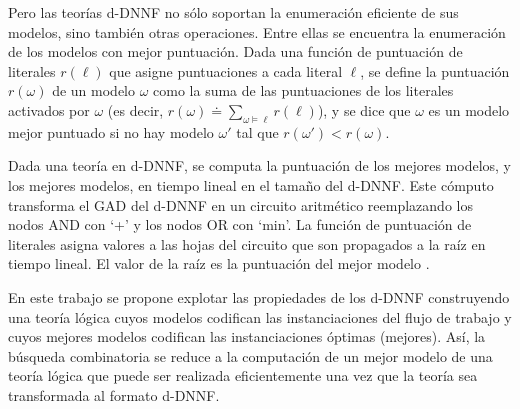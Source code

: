 Pero las teorías d-DNNF no sólo soportan la enumeración eficiente de sus
modelos, sino también otras operaciones. Entre ellas se encuentra la enumeración
de los modelos con mejor puntuación. Dada una función de puntuación de literales
$r(\ell)$ que asigne puntuaciones a cada literal $\ell$, se define la puntuación
$r(\omega)$ de un modelo $\omega$ como la suma de las puntuaciones de los literales
activados por $\omega$ (es decir,
$r(\omega)\doteq\sum_{\omega\vDash\ell}r(\ell)$), y se dice que $\omega$ es un modelo
mejor puntuado si no hay modelo $\omega'$ tal que $r(\omega')<r(\omega)$.

Dada una teoría en d-DNNF, se computa la puntuación de los mejores modelos, y
los mejores modelos, en tiempo lineal en el tamaño del d-DNNF. Este cómputo
transforma el GAD del d-DNNF en un circuito aritmético reemplazando los nodos
AND con `+' y los nodos OR con `min'. La función de puntuación de literales
asigna valores a las hojas del circuito que son propagados a la raíz en tiempo
lineal. El valor de la raíz es la puntuación del mejor modelo \cite{darwiche:weighted}.

En este trabajo se propone explotar las propiedades de los d-DNNF construyendo una
teoría lógica cuyos modelos codifican las instanciaciones del flujo de trabajo
y cuyos mejores modelos codifican las instanciaciones óptimas (mejores). Así, la
búsqueda combinatoria se reduce a la computación de un mejor modelo de una
teoría lógica que puede ser realizada eficientemente una vez que la teoría sea
transformada al formato d-DNNF.
